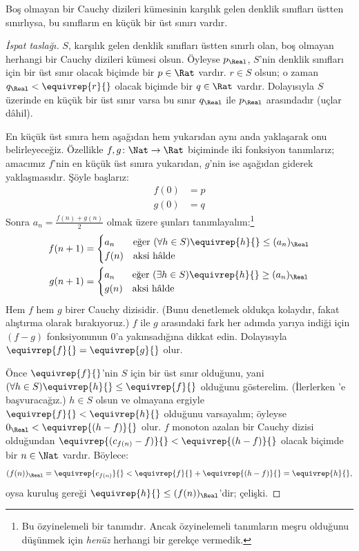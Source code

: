 \begin{thm}
Boş olmayan bir Cauchy dizileri kümesinin karşılık gelen denklik sınıfları
üstten sınırlıysa, bu sınıfların en küçük bir üst sınırı vardır.
\end{thm}

\begin{proof}[İspat taslağı]
$S$, karşılık gelen denklik sınıfları üstten sınırlı olan, boş olmayan
herhangi bir Cauchy dizileri kümesi olsun. Öyleyse $p_{\Real}$, $S$'nin
denklik sınıfları için bir üst sınır olacak biçimde bir $p \in \Rat$ vardır.
$r \in S$ olsun; o zaman $q_{\Real} < \equivrep{r}{}$ olacak biçimde bir
$q \in \Rat$ vardır. Dolayısıyla $S$ üzerinde en küçük bir üst sınır varsa
bu sınır $q_\Real$ ile $p_\Real$ arasındadır (uçlar dâhil).

En küçük üst sınıra hem aşağıdan hem yukarıdan aynı anda yaklaşarak onu
belirleyeceğiz. Özellikle $f, g \colon \Nat \to \Rat$ biçiminde iki fonksiyon
tanımlarız; amacımız $f$'nin en küçük üst sınıra yukarıdan, $g$'nin ise
aşağıdan giderek yaklaşmasıdır. Şöyle başlarız:
\begin{align*}
	f(0) &= p \\
	g(0) &= q
\end{align*}
Sonra $a_n = \frac{f(n) + g(n)}{2}$ olmak üzere şunları
tanımlayalım:\footnote{Bu özyinelemeli bir tanımdır. Ancak özyinelemeli
tanımların meşru olduğunu düşünmek için \emph{henüz} herhangi bir gerekçe
vermedik.}
\begin{align*}
	f(n+1) &=
	\begin{cases}
		a_n &\text{eğer }(\forall h \in S)\equivrep{h}{} \leq (a_n)_\Real\\
		f(n)&\text{aksi hâlde}
	\end{cases}\\
	g(n+1) &=
	\begin{cases}
		a_n &\text{eğer }(\exists h \in S)\equivrep{h}{} \geq (a_n)_\Real\\
	 	g(n) &\text{aksi hâlde}
	\end{cases}
\end{align*}
Hem $f$ hem $g$ birer Cauchy dizisidir. (Bunu denetlemek oldukça kolaydır,
fakat alıştırma olarak bırakıyoruz.) $f$ ile $g$ arasındaki fark her adımda
yarıya indiği için $(f-g)$ fonksiyonunun $0$'a yakınsadığına dikkat edin.
Dolayısıyla $\equivrep{f}{} = \equivrep{g}{}$ olur.

Önce $\equivrep{f}{}$'nin $S$ için bir üst sınır olduğunu, yani
$(\forall h \in S)\equivrep{h}{} \leq \equivrep{f}{}$ olduğunu gösterelim.
(İlerlerken 'e başvuracağız.) $h \in S$ olsun ve
olmayana ergiyle $\equivrep{f}{} < \equivrep{h}{}$ olduğunu varsayalım;
öyleyse $0_\Real < \equivrep{(h-f)}{}$ olur. $f$ monoton azalan bir Cauchy
dizisi olduğundan
$\equivrep{(c_{f(n)} - f)}{} < \equivrep{(h-f)}{}$ olacak biçimde bir
$n \in \Nat$ vardır. Böylece:
\[
	(f(n))_\Real = \equivrep{c_{f(n)}}{} < \equivrep{f}{} + \equivrep{(h-f)}{} = \equivrep{h}{},
\]
oysa kuruluş gereği $\equivrep{h}{} \leq (f(n))_\Real$'dir; çelişki.


\end{proof}
